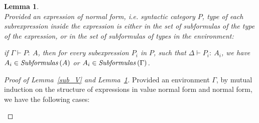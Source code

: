 \documentclass[a4paper]{article}
\newcommand{\typecolor}{}
\newcommand{\termcolor}{}
\newcommand{\tp}[1]{{\typecolor #1}}
\newcommand{\tm}[1]{{\termcolor #1}}
\newtheorem{lemma}[theorem]{Lemma}
\newcommand{\typing}[2]{\tm{#1:\ }\tp{#2}}
\newcommand{\txt}[1]{\text{\textit{#1}}}
\newcommand{\subformulas}[1]{\txt{Subformulas}\,(#1)}
\begin{document}
\begin{lemma}\ \\
\label{sub_P}
Provided an expression of normal form, i.e. syntactic category $P$,
type of each subrexpression inside the expression is either in the set of
subformulas of the type of the expression, or in the set
of subformulas of types in the environment:

 if $\Gamma \vdash \typing{P}{A}$, then for every subexpression $P_i$
 in $P$, such that $\Delta \vdash \typing{P_i}{A_i}$, we have $A_i \in
 \subformulas{A}$ or $A_i \in \subformulas{\Gamma}$. 
\end{lemma}
 
\begin{proof}[Proof of Lemma~\ref{sub_V} and Lemma~\ref{sub_P}]
Provided an environment $\Gamma$, by mutual induction on the structure
of expressions in value normal form and normal form, we have the
following cases:

\begin{description}


\end{description}
\end{proof}
\end{document}
